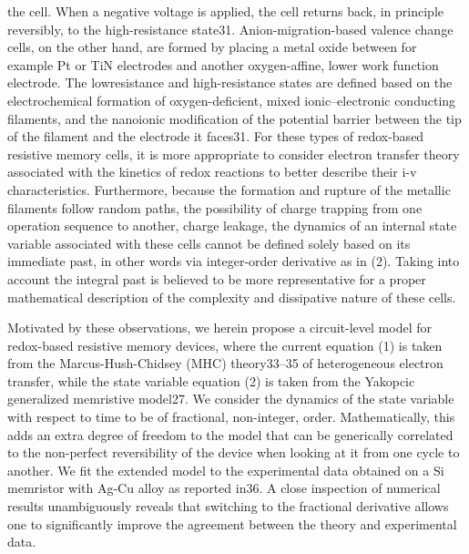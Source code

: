 \documentclass{article}
\begin{document}
{\begin{multicols}{2}
the cell. When a negative voltage is applied, the cell returns back, in principle reversibly, to the high-resistance state31. Anion-migration-based valence change cells, on
the other hand, are formed by placing a metal oxide
between for example Pt or TiN electrodes and another
oxygen-affine, lower work function electrode. The lowresistance and high-resistance states are defined based on
the electrochemical formation of oxygen-deficient, mixed
ionic–electronic conducting filaments, and the nanoionic
modification of the potential barrier between the tip of
the filament and the electrode it faces31. For these types
of redox-based resistive memory cells, it is more appropriate to consider electron transfer theory associated with
the kinetics of redox reactions to better describe their i-v
characteristics. Furthermore, because the formation and
rupture of the metallic filaments follow random paths,
the possibility of charge trapping from one operation sequence to another, charge leakage, the dynamics of an
internal state variable associated with these cells cannot
be defined solely based on its immediate past, in other
words via integer-order derivative as in (2). Taking into
account the integral past is believed to be more representative for a proper mathematical description of the
complexity and dissipative nature of these cells.\par 
Motivated by these observations, we herein propose
a circuit-level model for redox-based resistive memory
devices, where the current equation (1) is taken from
the Marcus-Hush-Chidsey (MHC) theory33–35 of heterogeneous electron transfer, while the state variable equation (2) is taken from the Yakopcic generalized memristive model27. We consider the dynamics of the state variable with respect to time to be of fractional, non-integer,
order. Mathematically, this adds an extra degree of freedom to the model that can be generically correlated to
the non-perfect reversibility of the device when looking
at it from one cycle to another. We fit the extended
model to the experimental data obtained on a Si memristor with Ag-Cu alloy as reported in36. A close inspection
of numerical results unambiguously reveals that switching to the fractional derivative allows one to significantly
improve the agreement between the theory and experimental data.
{\centering %
}
\end{multicols}}
\end{document}
